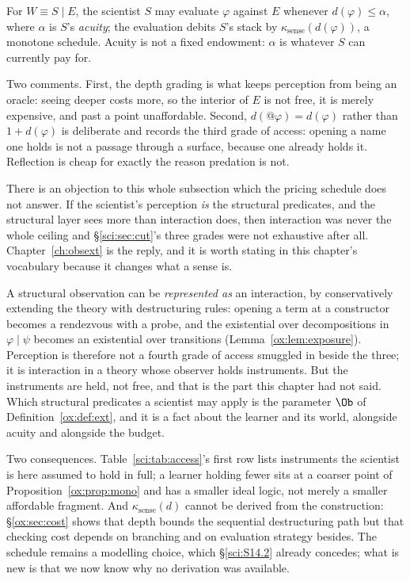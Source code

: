 \begin{definition}
\label{sci:def:sense}
For $W \equiv S \mid E$, the scientist $S$ may evaluate $\varphi$ against $E$ whenever
$d(\varphi) \le \alpha$, where $\alpha$ is $S$'s \emph{acuity}; the evaluation debits $S$'s stack by
$\kappa_{\mathrm{sense}}(d(\varphi))$, a monotone schedule. Acuity is not a fixed endowment: $\alpha$
is whatever $S$ can currently pay for.
\end{definition}

Two comments. First, the depth grading is what keeps perception from being an oracle: seeing deeper
costs more, so the interior of $E$ is not free, it is merely expensive, and past a point unaffordable.
Second, $d(@\varphi) = d(\varphi)$ rather than $1 + d(\varphi)$ is deliberate and records the third
grade of access: opening a name one holds is not a passage through a surface, because one already
holds it. Reflection is cheap for exactly the reason predation is not.

\begin{remark}
\label{sci:rem:senses-instruments}
There is an objection to this whole subsection which the pricing schedule does not answer. If the
scientist's perception \emph{is} the structural predicates, and the structural layer sees more than
interaction does, then interaction was never the whole ceiling and \S\ref{sci:sec:cut}'s three grades
were not exhaustive after all. Chapter~\ref{ch:obsext} is the reply, and it is worth stating in this
chapter's vocabulary because it changes what a sense is.

A structural observation can be \emph{represented as} an interaction, by conservatively extending the
theory with destructuring rules: opening a term at a constructor becomes a rendezvous with a probe,
and the existential over decompositions in $\varphi \mid \psi$ becomes an existential over
transitions (Lemma~\ref{ox:lem:exposure}). Perception is therefore not a fourth grade of access
smuggled in beside the three; it is interaction in a theory whose observer holds instruments. But the
instruments are held, not free, and that is the part this chapter had not said. Which structural
predicates a scientist may apply is the parameter $\Ob$ of Definition~\ref{ox:def:ext}, and it is a
fact about the learner and its world, alongside acuity and alongside the budget.

Two consequences. Table~\ref{sci:tab:access}'s first row lists instruments the scientist is here
assumed to hold in full; a learner holding fewer sits at a coarser point of
Proposition~\ref{ox:prop:mono} and has a smaller ideal logic, not merely a smaller affordable
fragment. And $\kappa_{\mathrm{sense}}(d)$ cannot be derived from the construction:
\S\ref{ox:sec:cost} shows that depth bounds the sequential destructuring path but that checking cost
depends on branching and on evaluation strategy besides. The schedule remains a modelling choice,
which \S\ref{sci:S14.2} already concedes; what is new is that we now know why no derivation was
available.
\end{remark}


